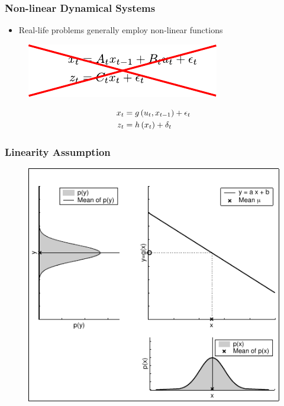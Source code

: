     \begin{frame}
    \frametitle{Non-linear Dynamical Systems}
    \begin{itemize}
    \item Real-life problems generally employ non-linear functions
    \end{itemize}
    
    
    \begin{figure}[!h] 
    \includegraphics[width=0.4\columnwidth]{./images/kalman_filter_linear_equations_cross_out.pdf}
     \end{figure}
    
     \begin{align*}
     x_{t} &= g\left( u_{t}, x_{t-1} \right) + \epsilon_{t}\\
     z_{t} &= h\left( x_{t} \right) + \delta_{t}
     \end{align*}
    
    \end{frame}
    
    \begin{frame}
     \frametitle{Linearity Assumption}
    
     \begin{figure}[!h]
     \includegraphics[width=0.5\columnwidth]{./images/linear_transformation_of_a_gaussian.pdf}
     \end{figure}
    \end{frame}
    
